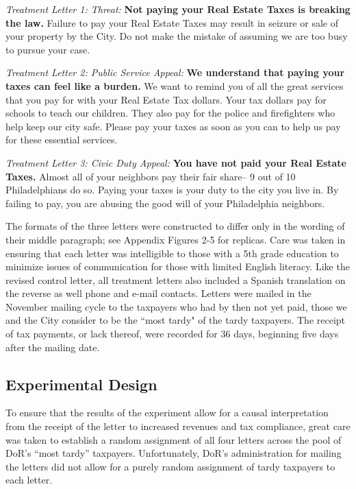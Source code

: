 \documentclass[12pt,titlepage]{article}
\begin{document}
{\it Treatment Letter 1: Threat: } {\bf Not paying your Real Estate
  Taxes is breaking the law.} Failure to pay your Real Estate Taxes
may result in seizure or sale of your property by the City. Do not
make the mistake of assuming we are too busy to pursue your case.

{\it Treatment Letter 2: Public Service Appeal: } {\bf We understand that
  paying your taxes can feel like a burden.} We want to remind you of
all the great services that you pay for with your Real Estate Tax
dollars. Your tax dollars pay for schools to teach our children.  They
also pay for the police and firefighters who help keep our city safe.
Please pay your taxes as soon as you can to help us pay for these
essential services.
  
{ \it Treatment Letter 3: Civic Duty Appeal: } {\bf You have not paid your
  Real Estate Taxes.}  Almost all of your neighbors pay their fair
share-- 9 out of 10 Philadelphians do so. Paying your taxes is your
duty to the city you live in. By failing to pay, you are abusing the
good will of your Philadelphia neighbors.

The formats of the three letters were constructed to differ only in
the wording of their middle paragraph; see Appendix Figures 2-5 for replicas.
Care was taken in ensuring that each letter was intelligible to those with a
5th grade education to minimize issues of communication for those with limited English
literacy.  Like the revised control letter, all treatment
letters also included a Spanish translation on the reverse as well phone
and e-mail contacts.  Letters were mailed in the November mailing cycle to the
taxpayers who had by then not yet paid, those we and the City consider to be
the ``most tardy" of the tardy taxpayers.  The receipt of tax payments,
or lack thereof, were recorded for 36 days, beginning five days after the
mailing date.


\subsection{Experimental Design}

To ensure that the results of the experiment allow for a causal
interpretation from the receipt of the letter to increased revenues and tax compliance,
great care was taken to establish a random assignment of all four
letters across the pool of DoR's ``most tardy'' taxpayers.
Unfortunately, DoR's administration for mailing the letters did not
allow for a purely random assignment of tardy taxpayers to each
letter.
\end{document}
